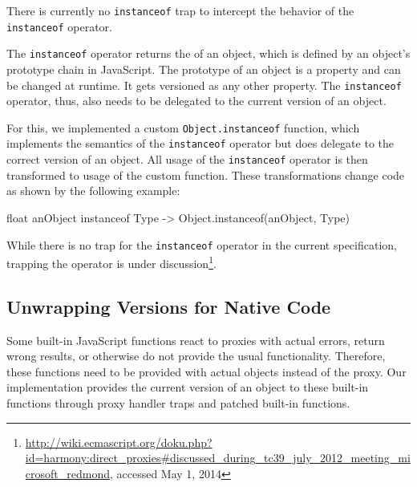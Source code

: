 There is currently no \lstinline{instanceof} trap to intercept the behavior of the \lstinline{instanceof} operator.

The \lstinline{instanceof} operator returns the of an object, which is defined by an object's prototype chain in JavaScript.
The prototype of an object is a property and can be changed at runtime.
It gets versioned as any other property.
The \lstinline{instanceof} operator, thus, also needs to be delegated to the current version of an object.

For this, we implemented a custom \lstinline{Object.instanceof} function, which implements the semantics of the \lstinline{instanceof} operator but does delegate to the correct version of an object.
All usage of the \lstinline{instanceof} operator is then transformed to usage of the custom function.
These transformations change code as shown by the following example: 

\begin{code}[]{}{float}
anObject instanceof Type -> Object.instanceof(anObject, Type)
\end{code}
\iffalse
\end{verbatim}\fi

While there is no trap for the \lstinline{instanceof} operator in the current specification, trapping the operator is under discussion\footnote{\url{http://wiki.ecmascript.org/doku.php?id=harmony:direct_proxies\#discussed_during_tc39_july_2012_meeting_microsoft_redmond}, accessed May 1, 2014}.


\subsection{Unwrapping Versions for Native Code} \label{subsec:IMPLEMENTATION:4.3}

Some built-in JavaScript functions react to proxies with actual errors, return wrong results, or otherwise do not provide the usual functionality.
Therefore, these functions need to be provided with actual objects instead of the proxy.
Our implementation provides the current version of an object to these built-in functions through proxy handler traps and patched built-in functions.

